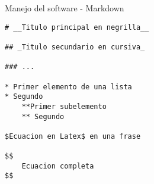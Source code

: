 \begin{frame}[fragile]{Manejo del software - Markdown}\vspace{10pt}

\begin{center}
\begin{lstlisting}
# __Titulo principal en negrilla__

## _Titulo secundario en cursiva_

### ...

* Primer elemento de una lista
* Segundo
	**Primer subelemento
	** Segundo

$Ecuacion en Latex$ en una frase

$$
	Ecuacion completa
$$

\end{lstlisting}
\end{center}

\end{frame}